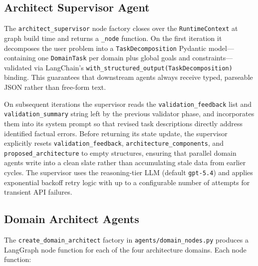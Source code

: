 \subsection{Architect Supervisor Agent}

The \texttt{architect\_supervisor} node factory closes over the \texttt{RuntimeContext} at graph build time and returns a \texttt{\_node} function. On the first iteration it decomposes the user problem into a \texttt{TaskDecomposition} Pydantic model---containing one \texttt{DomainTask} per domain plus global goals and constraints---validated via LangChain's \texttt{with\_structured\_output(TaskDecomposition)} binding. This guarantees that downstream agents always receive typed, parseable JSON rather than free-form text.

On subsequent iterations the supervisor reads the \texttt{validation\_feedback} list and \texttt{validation\_summary} string left by the previous validator phase, and incorporates them into its system prompt so that revised task descriptions directly address identified factual errors. Before returning its state update, the supervisor explicitly resets \texttt{validation\_feedback}, \texttt{architecture\_components}, and \texttt{proposed\_architecture} to empty structures, ensuring that parallel domain agents write into a clean slate rather than accumulating stale data from earlier cycles. The supervisor uses the reasoning-tier LLM (default \texttt{gpt-5.4}) and applies exponential backoff retry logic with up to a configurable number of attempts for transient API failures.

\subsection{Domain Architect Agents}

The \texttt{create\_domain\_architect} factory in \texttt{agents/domain\_nodes.py} produces a LangGraph node function for each of the four architecture domains. Each node function:

